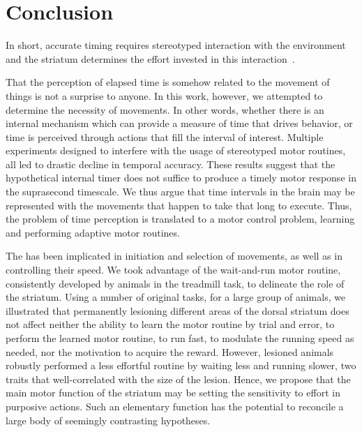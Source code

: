 \section{Conclusion} \label{ch:discussion:conclusion}

In short, accurate timing requires stereotyped interaction with the environment and the striatum determines the effort invested in this interaction~\cite{Safaie2020PNAS,JuradoParras2020}.
\par
That the perception of elapsed time is somehow related to the movement of things is not a surprise to anyone.
In this work, however, we attempted to determine the necessity of movements.
In other words, whether there is an internal mechanism which can provide a measure of time that drives behavior, or time is perceived through actions that fill the interval of interest.
Multiple experiments designed to interfere with the usage of stereotyped motor routines, all led to drastic decline in temporal accuracy.
These results suggest that the hypothetical internal timer does not suffice to produce a timely motor response in the suprasecond timescale.
We thus argue that time intervals in the brain may be represented with the movements that happen to take that long to execute.
Thus, the problem of time perception is translated to a motor control problem, learning and performing adaptive motor routines.
\par
The  has been implicated in initiation and selection of movements, as well as in controlling their speed.
We took advantage of the wait-and-run motor routine, consistently developed by animals in the treadmill task, to delineate the role of the striatum.
Using a number of original tasks, for a large group of animals, we illustrated that permanently lesioning different areas of the dorsal striatum does not affect neither the ability to learn the motor routine by trial and error, to perform the learned motor routine, to run fast, to modulate the running speed as needed, nor the motivation to acquire the reward.
However, lesioned animals robustly performed a less effortful routine by waiting less and running slower, two traits that well-correlated with the size of the lesion.
Hence, we propose that the main motor function of the striatum may be setting the sensitivity to effort in purposive actions.
Such an elementary function has the potential to reconcile a large body of seemingly contrasting hypotheses.